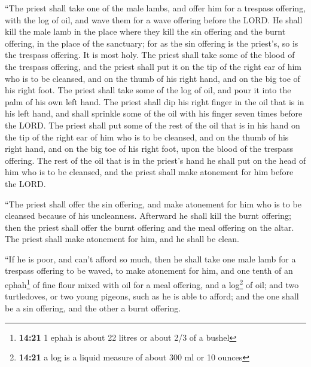  ``The priest shall take one of the male lambs, and offer
him for a trespass offering, with the log of oil, and wave them for a
wave offering before the LORD.  He shall kill the male
lamb in the place where they kill the sin offering and the burnt
offering, in the place of the sanctuary; for as the sin offering is the
priest's, so is the trespass offering. It is most holy. 
The priest shall take some of the blood of the trespass offering, and
the priest shall put it on the tip of the right ear of him who is to be
cleansed, and on the thumb of his right hand, and on the big toe of his
right foot.  The priest shall take some of the log of
oil, and pour it into the palm of his own left hand.  The
priest shall dip his right finger in the oil that is in his left hand,
and shall sprinkle some of the oil with his finger seven times before
the LORD.  The priest shall put some of the rest of the
oil that is in his hand on the tip of the right ear of him who is to be
cleansed, and on the thumb of his right hand, and on the big toe of his
right foot, upon the blood of the trespass offering.  The
rest of the oil that is in the priest's hand he shall put on the head of
him who is to be cleansed, and the priest shall make atonement for him
before the LORD.

 ``The priest shall offer the sin offering, and make
atonement for him who is to be cleansed because of his uncleanness.
Afterward he shall kill the burnt offering;  then the
priest shall offer the burnt offering and the meal offering on the
altar. The priest shall make atonement for him, and he shall be clean.

 ``If he is poor, and can't afford so much, then he shall
take one male lamb for a trespass offering to be waved, to make
atonement for him, and one tenth of an ephah\footnote{\textbf{14:21} 1
  ephah is about 22 litres or about 2/3 of a bushel} of fine flour mixed
with oil for a meal offering, and a log\footnote{\textbf{14:21} a log is
  a liquid measure of about 300 ml or 10 ounces} of oil; 
and two turtledoves, or two young pigeons, such as he is able to afford;
and the one shall be a sin offering, and the other a burnt offering.

